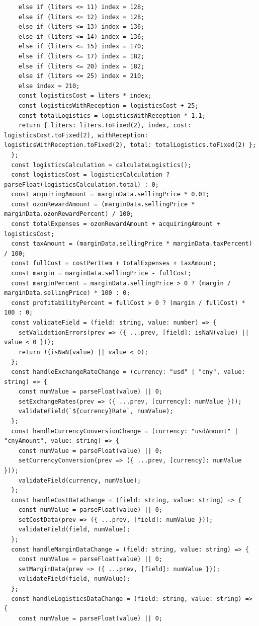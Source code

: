 \begin{code}
\begin{verbatim}
    else if (liters <= 11) index = 128;
    else if (liters <= 12) index = 128;
    else if (liters <= 13) index = 136;
    else if (liters <= 14) index = 136;
    else if (liters <= 15) index = 170;
    else if (liters <= 17) index = 182;
    else if (liters <= 20) index = 182;
    else if (liters <= 25) index = 210;
    else index = 210;
    const logisticsCost = liters * index;
    const logisticsWithReception = logisticsCost + 25;
    const totalLogistics = logisticsWithReception * 1.1;
    return { liters: liters.toFixed(2), index, cost: logisticsCost.toFixed(2), withReception: logisticsWithReception.toFixed(2), total: totalLogistics.toFixed(2) };
  };
  const logisticsCalculation = calculateLogistics();
  const logisticsCost = logisticsCalculation ? parseFloat(logisticsCalculation.total) : 0;
  const acquiringAmount = marginData.sellingPrice * 0.01;
  const ozonRewardAmount = (marginData.sellingPrice * marginData.ozonRewardPercent) / 100;
  const totalExpenses = ozonRewardAmount + acquiringAmount + logisticsCost;
  const taxAmount = (marginData.sellingPrice * marginData.taxPercent) / 100;
  const fullCost = costPerItem + totalExpenses + taxAmount;
  const margin = marginData.sellingPrice - fullCost;
  const marginPercent = marginData.sellingPrice > 0 ? (margin / marginData.sellingPrice) * 100 : 0;
  const profitabilityPercent = fullCost > 0 ? (margin / fullCost) * 100 : 0;
  const validateField = (field: string, value: number) => {
    setValidationErrors(prev => ({ ...prev, [field]: isNaN(value) || value < 0 }));
    return !(isNaN(value) || value < 0);
  };
  const handleExchangeRateChange = (currency: "usd" | "cny", value: string) => {
    const numValue = parseFloat(value) || 0;
    setExchangeRates(prev => ({ ...prev, [currency]: numValue }));
    validateField(`${currency}Rate`, numValue);
  };
  const handleCurrencyConversionChange = (currency: "usdAmount" | "cnyAmount", value: string) => {
    const numValue = parseFloat(value) || 0;
    setCurrencyConversion(prev => ({ ...prev, [currency]: numValue }));
    validateField(currency, numValue);
  };
  const handleCostDataChange = (field: string, value: string) => {
    const numValue = parseFloat(value) || 0;
    setCostData(prev => ({ ...prev, [field]: numValue }));
    validateField(field, numValue);
  };
  const handleMarginDataChange = (field: string, value: string) => {
    const numValue = parseFloat(value) || 0;
    setMarginData(prev => ({ ...prev, [field]: numValue }));
    validateField(field, numValue);
  };
  const handleLogisticsDataChange = (field: string, value: string) => {
    const numValue = parseFloat(value) || 0;

\end{verbatim}
\end{code}
